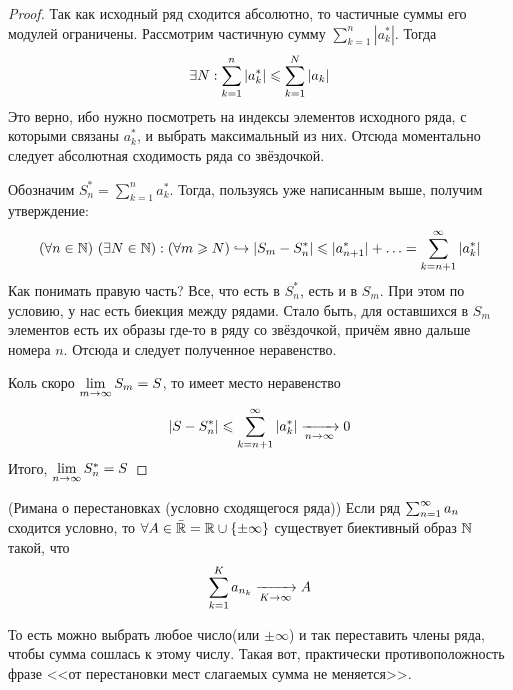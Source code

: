 \begin{proof}
	Так как исходный ряд сходится абсолютно, то частичные суммы его модулей ограничены. Рассмотрим частичную сумму $\sum_{k = 1}^n |a^*_k|$. Тогда
	\[
		\exists N : \sum\limits_{k = 1}^n |a^*_k| \leqslant \sum\limits_{k = 1}^N |a_k|
	\]
	Это верно, ибо нужно посмотреть на индексы элементов исходного ряда, с которыми связаны $a^*_k$, и выбрать максимальный из них. Отсюда моментально следует абсолютная сходимость ряда со звёздочкой.
	
	Обозначим $S^*_n = \sum_{k = 1}^n a^*_k$. Тогда, пользуясь уже написанным выше, получим утверждение:
	\[
		(\forall n \in \mathbb{N})\ (\exists N \in \mathbb{N}) : (\forall m \geqslant N) \hookrightarrow |S_m - S^*_n| \leqslant |a^*_{n + 1}| + \ldots =\sum\limits_{k = n + 1}^\infty |a^*_k|
	\]
	Как понимать правую часть? Все, что есть в $S^*_n$, есть и в $S_m$. При этом по условию, у нас есть биекция между рядами. Стало быть, для оставшихся в $S_m$ элементов есть их образы где-то в ряду со звёздочкой, причём явно дальше номера $n$. Отсюда и следует полученное неравенство.
	
	Коль скоро $\lim\limits_{m \to \infty} S_m = S$, то имеет место неравенство
	\[
		|S - S^*_n| \leqslant \sum\limits_{k = n + 1}^\infty |a^*_k| \xrightarrow[n \to \infty]{} 0
	\]
	Итого, $\lim\limits_{n \to \infty} S^*_n = S$
\end{proof}

\begin{theorem} (Римана о перестановках (условно сходящегося ряда))
	Если ряд $\sum_{n = 1}^\infty a_n$ сходится условно, то $\forall A \in \bar{\mathbb{R}} = \mathbb{R} \cup \{\pm \infty\}$ существует биективный образ $\mathbb{N}$ такой, что
	\[
		\sum\limits_{k = 1}^K a_{n_k} \xrightarrow[K \to \infty]{} A
	\]
	\begin{anote}
		
		То есть можно выбрать любое число(или $\pm\infty$) и так переставить члены ряда, чтобы сумма сошлась к этому числу. Такая вот, практически противоположность фразе <<от перестановки мест слагаемых сумма не меняется>>.
	\end{anote}
\end{theorem}

